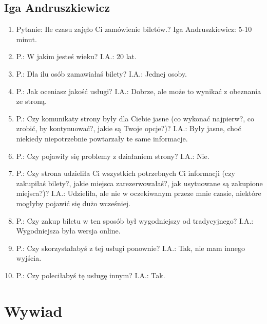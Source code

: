 \documentclass{article}
\begin{document}
\subsection{Iga Andruszkiewicz}
\begin{enumerate}
\item Pytanie: Ile czasu zajęło Ci zamówienie biletów.? \newline
Iga Andruszkiewicz: 5-10 minut.
\item P.: W jakim jesteś wieku? \newline
I.A.: 20 lat.
\item P.: Dla ilu osób zamawiałaś bilety? \newline
I.A.: Jednej osoby.
\item P.: Jak oceniasz jakość usługi? \newline
I.A.: Dobrze, ale może to wynikać z obeznania ze stroną.
\item P.: Czy komunikaty strony były dla Ciebie jasne (co wykonać najpierw?, co zrobić, by kontynuować?, jakie są Twoje opcje?)? \newline
I.A.: Były jasne, choć niekiedy niepotrzebnie powtarzały te same informacje.
\item P.: Czy pojawiły się problemy z działaniem strony? \newline
I.A.: Nie.
\item P.: Czy strona udzieliła Ci wszystkich potrzebnych Ci informacji (czy zakupiłaś bilety?, jakie miejsca zarezerwowałaś?, jak usytuowane są zakupione miejsca?)? \newline
I.A.: Udzieliła, ale nie w oczekiwanym przeze mnie czasie, niektóre mogłyby pojawić się dużo wcześniej.
\item P.: Czy zakup biletu w ten sposób był wygodniejszy od tradycyjnego? \newline
I.A.: Wygodniejsza była wersja online.
\item P.: Czy skorzystałabyś z tej usługi ponownie? \newline
I.A.: Tak, nie mam innego wyjścia.
\item P.: Czy poleciłabyś tę usługę innym? \newline
I.A.: Tak.
\end{enumerate}

\section{Wywiad}
\label{5.}
\end{document}
